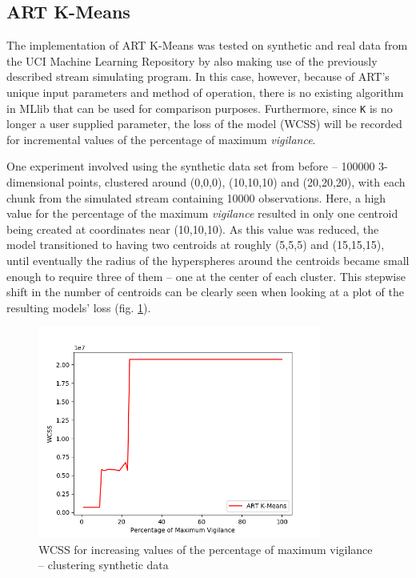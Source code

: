 \documentclass{l4proj}
\begin{document}
\subsection{ART K-Means}

The implementation of ART K-Means was tested on synthetic and real data from the UCI Machine Learning Repository by also making use of the previously described stream simulating program. In this case, however, because of ART's unique input parameters and method of operation, there is no existing algorithm in MLlib that can be used for comparison purposes. Furthermore, since \texttt{K} is no longer a user supplied parameter, the loss of the model (WCSS) will be recorded for incremental values of the percentage of maximum \textit{vigilance}.

One experiment involved using the synthetic data set from before -- 100000 3-dimensional points, clustered around (0,0,0), (10,10,10) and (20,20,20), with each chunk from the simulated stream containing 10000 observations. Here, a high value for the percentage of the maximum \textit{vigilance} resulted in only one centroid being created at coordinates near (10,10,10). As this value was reduced, the model transitioned to having two centroids at roughly (5,5,5) and (15,15,15), until eventually the radius of the hyperspheres around the centroids became small enough to require three of them -- one at the center of each cluster. This stepwise shift in the number of centroids can be clearly seen when looking at a plot of the resulting models' loss (fig. \ref{fig:res12}).

\begin{figure}[H]
	\centering
    \includegraphics[width=0.83\textwidth]{images/result12}
    \caption{WCSS for increasing values of the percentage of maximum vigilance -- clustering synthetic data} 
    \label{fig:res12}
\end{figure}
\end{document}
